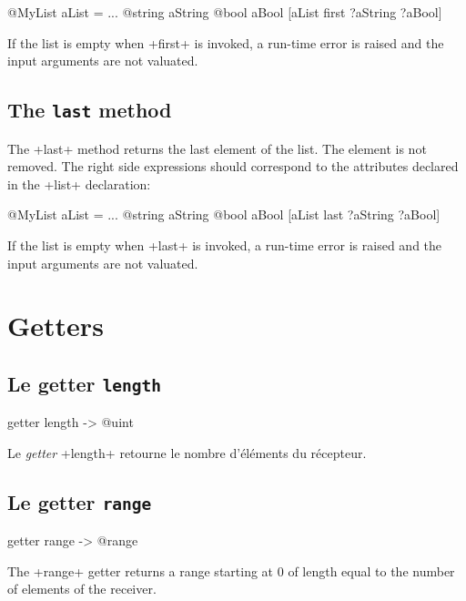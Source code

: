 \begin{galgas}
@MyList aList = ...
@string aString
@bool aBool
[aList first ?aString ?aBool]
\end{galgas}

If the list is empty when \ggs+first+ is invoked, a run-time error is raised and the input arguments are not valuated.

\subsection{The \texttt{last} method}

The \ggs+last+ method returns the last element of the list. The element is not removed. The right side expressions should correspond to the attributes declared in the \ggs+list+ declaration:\\

\begin{galgas}
@MyList aList = ...
@string aString
@bool aBool
[aList last ?aString ?aBool]
\end{galgas}


If the list is empty when \ggs+last+ is invoked, a run-time error is raised and the input arguments are not valuated.








\section{Getters}

\subsection{Le getter \texttt{length}}

\begin{galgas}
getter length -> @uint
\end{galgas}

Le \emph{getter} \ggs+length+ retourne le nombre d'éléments du récepteur.


\subsection{Le getter \texttt{range}}

\begin{galgas}
getter range -> @range
\end{galgas}

The \ggs+range+ getter returns a range starting at $0$ of length equal to the number of elements of the receiver.




